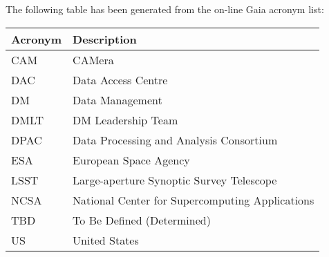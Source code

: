 The following table has been generated from the on-line Gaia acronym list:
\newline\newline%
\addtocounter{table}{-1}
\begin{longtable}{|l|p{}|}\hline
\textbf{Acronym} & \textbf{Description}  \\\hline
CAM&CAMera \\\hline
DAC&Data Access Centre \\\hline
DM&Data Management \\\hline
DMLT&DM Leadership Team \\\hline
DPAC&Data Processing and Analysis Consortium \\\hline
ESA&European Space Agency \\\hline
LSST&Large-aperture Synoptic Survey Telescope \\\hline
NCSA&National Center for Supercomputing Applications \\\hline
TBD&To Be Defined (Determined) \\\hline
US&United States \\\hline
\end{longtable}
